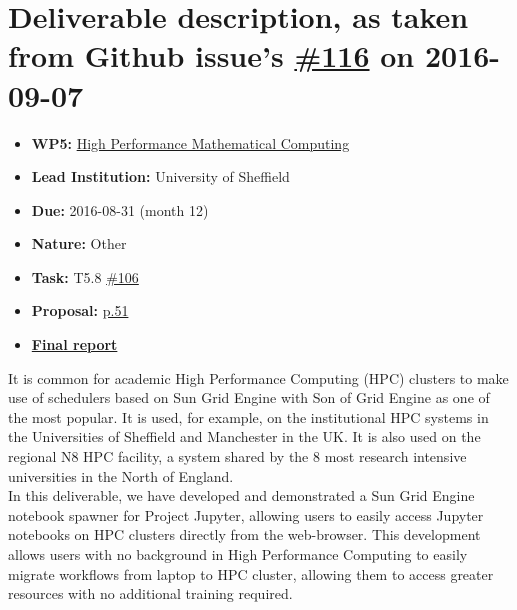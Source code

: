\section*{\texorpdfstring{Deliverable description, as taken from Github
issue's
\href{https://github.com/OpenDreamKit/OpenDreamKit/issues/116}{\#116} on
2016-09-07}{Deliverable description, as taken from Github issue's \#116 on 2016-09-07}}\label{deliverable-description-as-taken-from-github-issues-116-on-2016-09-07}

\begin{itemize}
\tightlist
\item
  \textbf{WP5:}
  \href{https://github.com/OpenDreamKit/OpenDreamKit/tree/master/WP5}{High
  Performance Mathematical Computing}
\item
  \textbf{Lead Institution:} University of Sheffield
\item
  \textbf{Due:} 2016-08-31 (month 12)
\item
  \textbf{Nature:} Other
\item
  \textbf{Task:} T5.8
  \href{https://github.com/OpenDreamKit/OpenDreamKit/issues/106}{\#106}
\item
  \textbf{Proposal:}
  \href{https://github.com/OpenDreamKit/OpenDreamKit/raw/master/Proposal/proposal-www.pdf}{p.51}
\item
  \textbf{\href{https://github.com/OpenDreamKit/OpenDreamKit/raw/master/WP5/D5.3/report-final.pdf}{Final
  report}}
\end{itemize}

It is common for academic High Performance Computing (HPC) clusters to
make use of schedulers based on Sun Grid Engine with Son of Grid Engine
as one of the most popular. It is used, for example, on the
institutional HPC systems in the Universities of Sheffield and
Manchester in the UK. It is also used on the regional N8 HPC facility, a
system shared by the 8 most research intensive universities in the North
of England.\\
In this deliverable, we have developed and demonstrated a Sun Grid
Engine notebook spawner for Project Jupyter, allowing users to easily
access Jupyter notebooks on HPC clusters directly from the web-browser.
This development allows users with no background in High Performance
Computing to easily migrate workflows from laptop to HPC cluster,
allowing them to access greater resources with no additional training
required.

